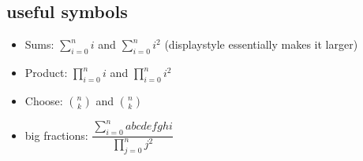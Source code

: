 \documentclass[12pt]{article}
\begin{document}
  \subsection{useful symbols}

  \begin{itemize}
    \item Sums: $ \sum_{i=0}^n i $ and $ \displaystyle \sum_{i=0}^n i^2$ (displaystyle essentially makes it larger)
    \item Product: $ \prod_{i=0}^n i $ and $\displaystyle \prod_{i=0}^n i^2 $
    \item Choose: ${n \choose k}$ and $\displaystyle {n \choose k}$
    \item big fractions: $\dfrac{\sum_{i=0}^n abcdefghi}{ \prod_{j=0}^n j^2 }$
  \end{itemize}
\end{document}
